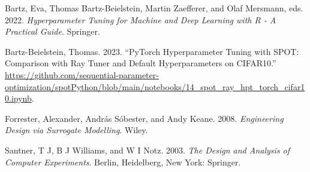 \documentclass[
  letterpaper,
  DIV=11,
  numbers=noendperiod]{scrreprt}
\newlength{\cslhangindent}
\newlength{\cslentryspacingunit} %
\newenvironment{CSLReferences}[2] %
 {%
  \setlength{\parindent}{0pt}
  \ifodd #1
  \let\oldpar\par
  \def\par{\hangindent=\cslhangindent\oldpar}
  \fi
  \setlength{\parskip}{#2\cslentryspacingunit}
 }%
 {}
\begin{document}

\hypertarget{refs}{}
\begin{CSLReferences}{1}{0}
\leavevmode{}%
Bartz, Eva, Thomas Bartz-Beielstein, Martin Zaefferer, and Olaf
Mersmann, eds. 2022. \emph{{Hyperparameter Tuning for Machine and Deep
Learning with R - A Practical Guide}}. Springer.

\leavevmode{}%
Bartz-Beielstein, Thomas. 2023. {``{PyTorch} Hyperparameter Tuning with
{SPOT}: Comparison with {Ray Tuner} and Default Hyperparameters on
{CIFAR10}.''}
\url{https://github.com/sequential-parameter-optimization/spotPython/blob/main/notebooks/14_spot_ray_hpt_torch_cifar10.ipynb}.

\leavevmode{}%
Forrester, Alexander, András Sóbester, and Andy Keane. 2008.
\emph{{Engineering Design via Surrogate Modelling}}. Wiley.

\leavevmode{}%
Santner, T J, B J Williams, and W I Notz. 2003. \emph{{The Design and
Analysis of Computer Experiments}}. Berlin, Heidelberg, New York:
Springer.

\end{CSLReferences}
\end{document}
